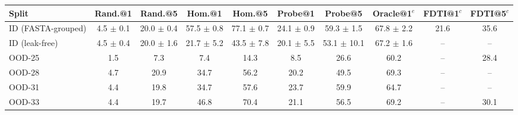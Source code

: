 \begin{tabular}{lccccccccc}
\toprule
Split & Rand.@1 & Rand.@5 & Hom.@1 & Hom.@5 & Probe@1 & Probe@5 & Oracle@1$^e$ & FDTI@1$^c$ & FDTI@5$^c$ \\
\midrule
ID (FASTA-grouped) & 4.5 $\pm$ 0.1 & 20.0 $\pm$ 0.4 & 57.5 $\pm$ 0.8 & 77.1 $\pm$ 0.7 & 24.1 $\pm$ 0.9 & 59.3 $\pm$ 1.5 & 67.8 $\pm$ 2.2 & 21.6 & 35.6 \\
ID (leak-free) & 4.5 $\pm$ 0.4 & 20.0 $\pm$ 1.6 & 21.7 $\pm$ 5.2 & 43.5 $\pm$ 7.8 & 20.1 $\pm$ 5.5 & 53.1 $\pm$ 10.1 & 67.2 $\pm$ 1.6 & -- & -- \\
OOD-25 & 1.5 & 7.3 & 7.4 & 14.3 & 8.5 & 26.6 & 60.2 & -- & 28.4 \\
OOD-28 & 4.7 & 20.9 & 34.7 & 56.2 & 20.2 & 49.5 & 69.3 & -- & -- \\
OOD-31 & 4.4 & 19.8 & 34.7 & 57.6 & 23.7 & 59.9 & 64.7 & -- & -- \\
OOD-33 & 4.4 & 19.7 & 46.8 & 70.4 & 21.1 & 56.5 & 69.2 & -- & 30.1 \\
\bottomrule
\end{tabular}
